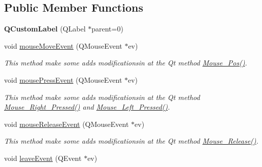 \subsection*{Public Member Functions}
\begin{DoxyCompactItemize}
\item 
{\bfseries Q\+Custom\+Label} (Q\+Label $\ast$parent=0)\hypertarget{classQCustomLabel_a15eca432ecab522f162c87374ac6bca6}{}\label{classQCustomLabel_a15eca432ecab522f162c87374ac6bca6}

\item 
void \hyperlink{classQCustomLabel_a834a064e119add6ffb0ff1ea5ce78d7e}{mouse\+Move\+Event} (Q\+Mouse\+Event $\ast$ev)\hypertarget{classQCustomLabel_a834a064e119add6ffb0ff1ea5ce78d7e}{}\label{classQCustomLabel_a834a064e119add6ffb0ff1ea5ce78d7e}

\begin{DoxyCompactList}\small\item\em This method make some adds modificationsin at the Qt method \hyperlink{classQCustomLabel_a45deee93a6a40df2979492a2ff680c88}{Mouse\+\_\+\+Pos()}. \end{DoxyCompactList}\item 
void \hyperlink{classQCustomLabel_a971a01e5c52150d2874555c5d6b11807}{mouse\+Press\+Event} (Q\+Mouse\+Event $\ast$ev)\hypertarget{classQCustomLabel_a971a01e5c52150d2874555c5d6b11807}{}\label{classQCustomLabel_a971a01e5c52150d2874555c5d6b11807}

\begin{DoxyCompactList}\small\item\em This method make some adds modificationsin at the Qt method \hyperlink{classQCustomLabel_a221ee1658fe8b86dbcc9036e7b740ab8}{Mouse\+\_\+\+Right\+\_\+\+Pressed()} and \hyperlink{classQCustomLabel_a6c990d236a4ff2e2898a3e84cd130f9b}{Mouse\+\_\+\+Left\+\_\+\+Pressed()}. \end{DoxyCompactList}\item 
void \hyperlink{classQCustomLabel_ab88c55fd49219104cfabe91ed68aa496}{mouse\+Release\+Event} (Q\+Mouse\+Event $\ast$ev)\hypertarget{classQCustomLabel_ab88c55fd49219104cfabe91ed68aa496}{}\label{classQCustomLabel_ab88c55fd49219104cfabe91ed68aa496}

\begin{DoxyCompactList}\small\item\em This method make some adds modificationsin at the Qt method \hyperlink{classQCustomLabel_a1725399a11e80f0c79f3d1c63cf505ef}{Mouse\+\_\+\+Release()}. \end{DoxyCompactList}\item 
void \hyperlink{classQCustomLabel_a99b5c445f092757d5f1e59c6aee6fb88}{leave\+Event} (Q\+Event $\ast$ev)\hypertarget{classQCustomLabel_a99b5c445f092757d5f1e59c6aee6fb88}{}\label{classQCustomLabel_a99b5c445f092757d5f1e59c6aee6fb88}


\end{DoxyCompactItemize}
